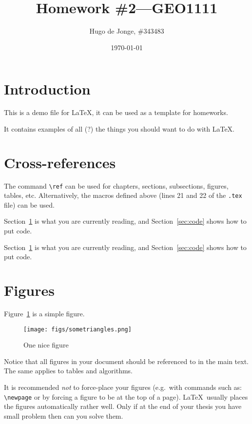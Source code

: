 \documentclass[a4paper,11pt,parskip=half]{scrartcl}
\title{\LARGE Homework \#2---GEO1111}
\author{Hugo de Jonge, \#343483}
\date{\today}
\newcommand{\eg}{e.g.}
\newcommand{\refsec}[1]{Section~\ref{#1}}
\begin{document}
\maketitle

%
\section{Introduction}%
\label{sec:intro}

This is a demo file for \LaTeX, it can be used as a template for homeworks.

It contains examples of all (?) the things you should want to do with \LaTeX.



%
\section{Cross-references}

The command \texttt{\textbackslash{}ref} can be used for chapters, sections, subsections, figures, tables, etc.
Alternatively, the macros defined above (lines 21 and 22 of the \texttt{.tex} file) can be used.


Section~\ref{sec:intro} is what you are currently reading, and Section~\ref{sec:code} shows how to put code.

\refsec{sec:intro} is what you are currently reading, and \refsec{sec:code} shows how to put code.


%
\section{Figures}%
\label{sec:figures}

Figure~\ref{fig:sometriangles} is a simple figure.
\begin{figure}
  \centering
  \texttt{[image: figs/sometriangles.png]}
  \caption{One nice figure}%
\label{fig:sometriangles}
\end{figure}
Notice that all figures in your document should be referenced to in the main text.
The same applies to tables and algorithms.

It is recommended \emph{not} to force-place your figures (\eg\ with commands such as: \texttt{\textbackslash{}newpage} or by forcing a figure to be at the top of a page).
\LaTeX\ usually places the figures automatically rather well.
Only if at the end of your thesis you have small problem then can you solve them.
\end{document}
